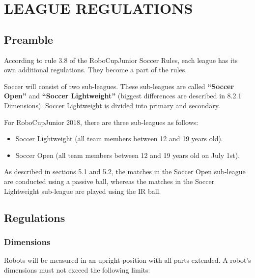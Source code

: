\documentclass{article}
\begin{document}
\section{LEAGUE REGULATIONS \label{ref-052}}

\subsection{ Preamble \label{ref-053}}

According to rule 3.8 of the RoboCupJunior Soccer Rules, each league has its own additional regulations. They become a part of the rules.

Soccer will consist of two sub-leagues. These sub-leagues are called \textbf{``}\textbf{Soccer Open}\textbf{''} and \textbf{``}\textbf{Soccer Lightweight}\textbf{''} (biggest differences are described in 8.2.1 Dimensions). Soccer Lightweight is divided into primary and secondary.

For RoboCupJunior 2018, there are three sub-leagues as follows:

\begin{itemize}

\item Soccer Lightweight (all team members between 12 and 19 years old).

\item Soccer Open (all team members between 12 and 19 years old on July 1st).

\end{itemize}
As described in sections 5.1 and 5.2, the matches in the Soccer Open sub-league are conducted using a passive ball, whereas the matches in the Soccer Lightweight sub-league are played using the IR ball.

\subsection{Regulations \label{ref-054}}

\subsubsection{Dimensions \label{ref-055}}

Robots will be measured in an upright position with all parts extended. A robot's dimensions must not exceed the following limits:
\end{document}
